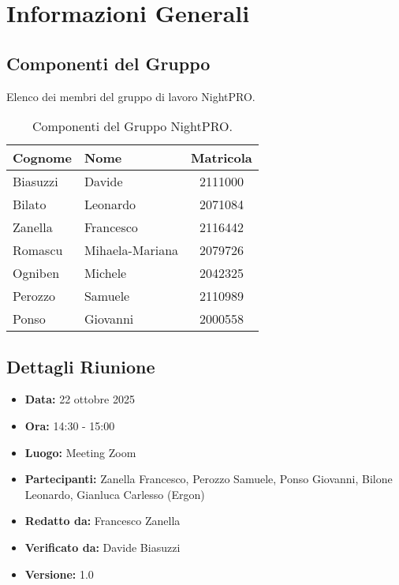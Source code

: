 \documentclass[a4paper, 11pt, oneside]{scrartcl} %
\begin{document}
\section{Informazioni Generali}

\subsection{Componenti del Gruppo}
Elenco dei membri del gruppo di lavoro NightPRO.

\begin{table}[h!]
\centering
\begin{tabular}{@{}llc@{}}
\toprule
\textbf{Cognome} & \textbf{Nome} & \textbf{Matricola} \\
\midrule
Biasuzzi & Davide & 2111000 \\
Bilato & Leonardo & 2071084 \\
Zanella & Francesco & 2116442 \\
Romascu & Mihaela-Mariana & 2079726 \\
Ogniben & Michele & 2042325 \\
Perozzo & Samuele & 2110989 \\
Ponso & Giovanni & 2000558 \\
\bottomrule
\end{tabular}
\caption{Componenti del Gruppo NightPRO.}
\end{table}


\subsection{Dettagli Riunione}
\begin{itemize}
    \item \textbf{Data:} 22 ottobre 2025
    \item \textbf{Ora:} 14:30 - 15:00
    \item \textbf{Luogo:} Meeting Zoom
    \item \textbf{Partecipanti:} Zanella Francesco, Perozzo Samuele, Ponso Giovanni, Bilone Leonardo, Gianluca Carlesso (Ergon)
    \item  \textbf{Redatto da: } Francesco Zanella
    \item  \textbf{Verificato da:} Davide Biasuzzi
    \item \textbf{Versione: } 1.0
\end{itemize}


\newpage
\end{document}
